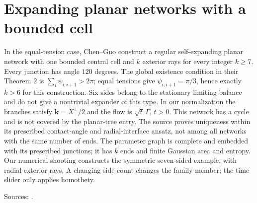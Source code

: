 \chapter{Expanding planar networks with a bounded cell}\label{sec:catalogue-expanding-cycle-networks}
\begin{example}\label{ex:catalogue-expanding-cycle-networks}
In the equal-tension case, Chen--Guo construct a regular self-expanding planar network with one bounded central cell and $k$ exterior rays for every integer $k\ge7$. Every junction has angle $120$ degrees. The global existence condition in their Theorem 2 is $\sum_i\psi_{i,i+1}>2\pi$; equal tensions give $\psi_{i,i+1}=\pi/3$, hence exactly $k>6$ for this construction. Six sides belong to the stationary limiting balance and do not give a nontrivial expander of this type.
In our normalization the branches satisfy $\mathbf k=X^\perp/2$ and the flow is $\sqrt t\,\Gamma$, $t>0$. This network has a cycle and is not covered by the planar-tree entry. The source proves uniqueness within its prescribed contact-angle and radial-interface ansatz, not among all networks with the same number of ends. The parameter graph is complete and embedded with its prescribed junctions; it has $k$ ends and finite Gaussian area and entropy. Our numerical shooting constructs the symmetric seven-sided example, with radial exterior rays. A changing side count changes the family member; the time slider only applies homothety.
\par Sources: \cite{CatChenGuo2007}.
\end{example}

